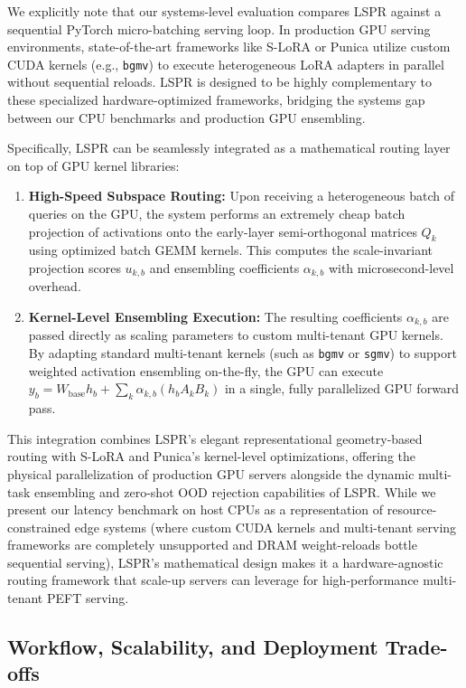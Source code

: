 We explicitly note that our systems-level evaluation compares LSPR against a sequential PyTorch micro-batching serving loop. In production GPU serving environments, state-of-the-art frameworks like S-LoRA \cite{slora2024} or Punica \cite{punica2024} utilize custom CUDA kernels (e.g., \texttt{bgmv}) to execute heterogeneous LoRA adapters in parallel without sequential reloads. LSPR is designed to be highly complementary to these specialized hardware-optimized frameworks, bridging the systems gap between our CPU benchmarks and production GPU ensembling. 

Specifically, LSPR can be seamlessly integrated as a mathematical routing layer on top of GPU kernel libraries:
\begin{enumerate}
    \item \textbf{High-Speed Subspace Routing:} Upon receiving a heterogeneous batch of queries on the GPU, the system performs an extremely cheap batch projection of activations onto the early-layer semi-orthogonal matrices $Q_k$ using optimized batch GEMM kernels. This computes the scale-invariant projection scores $u_{k, b}$ and ensembling coefficients $\alpha_{k, b}$ with microsecond-level overhead.
    \item \textbf{Kernel-Level Ensembling Execution:} The resulting coefficients $\alpha_{k, b}$ are passed directly as scaling parameters to custom multi-tenant GPU kernels. By adapting standard multi-tenant kernels (such as \texttt{bgmv} or \texttt{sgmv}) to support weighted activation ensembling on-the-fly, the GPU can execute $y_b = W_{\text{base}} h_b + \sum_k \alpha_{k, b} (h_b A_k B_k)$ in a single, fully parallelized GPU forward pass.
\end{enumerate}
This integration combines LSPR's elegant representational geometry-based routing with S-LoRA and Punica's kernel-level optimizations, offering the physical parallelization of production GPU servers alongside the dynamic multi-task ensembling and zero-shot OOD rejection capabilities of LSPR. While we present our latency benchmark on host CPUs as a representation of resource-constrained edge systems (where custom CUDA kernels and multi-tenant serving frameworks are completely unsupported and DRAM weight-reloads bottle sequential serving), LSPR's mathematical design makes it a hardware-agnostic routing framework that scale-up servers can leverage for high-performance multi-tenant PEFT serving.

\subsection{Workflow, Scalability, and Deployment Trade-offs}
\label{subsec:exp_tradeoffs}

